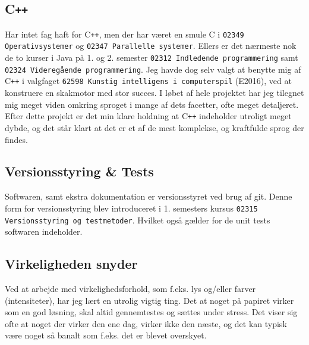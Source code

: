 \subsection{C\texttt{++}}
Har intet fag haft for C\texttt{++}, men der har været en smule C i \texttt{02349 Operativsystemer} og \texttt{02347 Parallelle systemer}. Ellers er det nærmeste nok de to kurser i Java på 1. og 2. semester \texttt{02312 Indledende programmering} samt \texttt{02324 Videregående programmering}.
Jeg havde dog selv valgt at benytte mig af C\texttt{++} i valgfaget \texttt{62598 Kunstig intelligens i computerspil} (E2016), ved at konstruere en skakmotor med stor succes.
I løbet af hele projektet har jeg tilegnet mig meget viden omkring sproget i mange af dets facetter, ofte meget detaljeret. Efter dette projekt er det min klare holdning at C\texttt{++} indeholder utroligt meget dybde, og det står klart at det er et af de mest komplekse, og kraftfulde sprog der findes.

\subsection{Versionsstyring \& Tests}
Softwaren, samt ekstra dokumentation er versionsstyret ved brug af git. Denne form for versionsstyring blev introduceret i 1. semesters kursus \texttt{02315 Versionsstyring og testmetoder}. Hvilket også gælder for de unit tests softwaren indeholder.

\subsection{Virkeligheden snyder}
Ved at arbejde med virkelighedsforhold, som f.eks. lys og/eller farver (intensiteter), har jeg lært en utrolig vigtig ting. Det at noget på papiret virker som en god løsning, skal altid gennemtestes og sættes under stress.
Det viser sig ofte at noget der virker den ene dag, virker ikke den næste, og det kan typisk være noget så banalt som f.eks. det er blevet overskyet.
